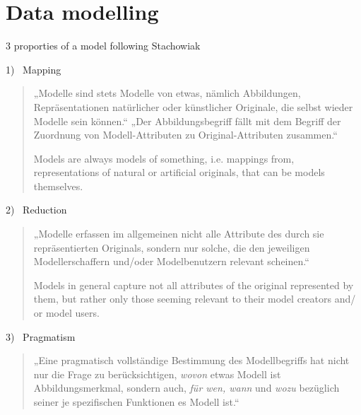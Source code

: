 



\section{Data modelling}


\begin{frame}[allowframebreaks]{3 proporties of a model following Stachowiak}

\begin{alertblock}{1)~ Mapping }
\begin{quote} \scriptsize
    „Modelle sind stets Modelle von etwas, nämlich Abbildungen, Repräsentationen natürlicher oder künstlicher Originale, die selbst wieder Modelle sein können.“ 
    „Der Abbildungsbegriff fällt mit dem Begriff der Zuordnung von Modell-Attributen zu Original-Attributen zusammen.“ \parencite[131--132]{stachowiak} %
    
    \alert{Models are always models of something, i.e. mappings from, representations of natural or artificial originals, that can be models themselves.}
\end{quote}
\end{alertblock}
\begin{alertblock}{2)~ Reduction}
\begin{quote} \scriptsize
    „Modelle erfassen im allgemeinen nicht alle Attribute des durch sie repräsentierten Originals, sondern nur solche, die den jeweiligen Modellerschaffern und/oder Modelbenutzern relevant scheinen.“ \parencite[132]{stachowiak}
    
    \alert{Models in general capture not all attributes of the original represented by them, but rather only those seeming relevant to their model creators and/ or model users.}
\end{quote}
\end{alertblock}
\framebreak 

\begin{alertblock}{3)~ Pragmatism}
\begin{quote} \scriptsize
    „Eine pragmatisch vollständige Bestimmung des Modellbegriffs hat nicht nur die Frage zu berücksichtigen, \emph{wovon} etwas Modell ist \lbrack{}Abbildungsmerkmal\rbrack{}, sondern auch, \emph{für wen, wann} und \emph{wozu} bezüglich seiner je spezifischen Funktionen es Modell ist.“ \parencite[132]{stachowiak} %
    

\end{quote}
\end{alertblock}
\end{frame}
